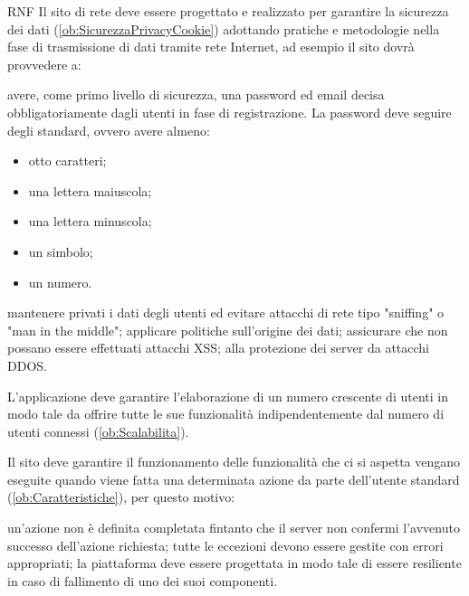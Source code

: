 \begin{listaPersonale}{RNF}
       Il sito di rete deve essere progettato e realizzato per garantire la sicurezza dei dati (\ref{ob:SicurezzaPrivacyCookie}) adottando pratiche e metodologie nella fase di trasmissione di dati tramite rete Internet, ad esempio il sito dovrà provvedere a:
      \begin{listaPersonale2}[RNF]{}
             avere, come primo livello di sicurezza, una password ed email decisa obbligatoriamente dagli utenti in fase di registrazione. La password deve seguire degli standard, ovvero avere almeno:
            \begin{itemize}
                  \item otto caratteri;
                  \item una lettera maiuscola;
                  \item una lettera minuscola;
                  \item un simbolo;
                  \item un numero.
            \end{itemize}
             mantenere privati i dati degli utenti ed evitare attacchi di rete tipo "sniffing" o "man in the middle";
             applicare politiche sull'origine dei dati;
             assicurare che non possano essere effettuati attacchi XSS;
             alla protezione dei server da attacchi DDOS.
      \end{listaPersonale2}

       L'applicazione deve garantire l'elaborazione di un numero crescente di utenti in modo tale da offrire tutte le sue funzionalità indipendentemente dal numero di utenti connessi (\ref{ob:Scalabilita}).

       Il sito deve garantire il funzionamento delle funzionalità che ci si aspetta vengano eseguite quando viene fatta una determinata azione da parte dell'utente standard (\ref{ob:Caratteristiche}), per questo motivo:
      \begin{listaPersonale2}[RNF]{}
             un'azione non è definita completata fintanto che il server non confermi l'avvenuto successo dell'azione richiesta;
             tutte le eccezioni devono essere gestite con errori appropriati;
             la piattaforma deve essere progettata in modo tale di essere resiliente in caso di fallimento di uno dei suoi componenti.
      \end{listaPersonale2}


\end{listaPersonale}
